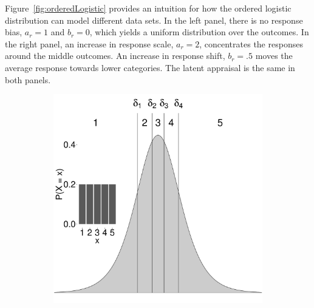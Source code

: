 \documentclass{article}
\newcommand{\Irater}{r}
\begin{document}
Figure~\ref{fig:orderedLogistic} provides an intuition for how the ordered logistic distribution can model different data sets. In the left panel, there is no response bias, $a_\Irater = 1$ and $b_\Irater = 0$, which yields a uniform distribution over the outcomes. In the right panel, an increase in response scale, $a_\Irater = 2$, concentrates the responses around the middle outcomes. An increase in response shift, $b_\Irater = .5$ moves the average response towards lower categories. The latent appraisal is the same in both panels.
\begin{figure}[!ht]
	\centering
	\begin{subfigure}{.5\textwidth}
		\centering
		\includegraphics[width=.98\textwidth]{figures/orderedLogisticUnbiased.pdf}
	\end{subfigure}%
	\begin{subfigure}{.5\textwidth}
		\centering

\end{subfigure}
\end{figure}
\end{document}
